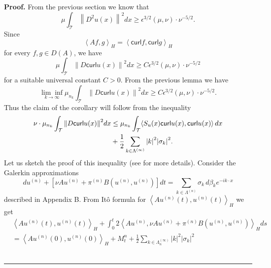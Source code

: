\documentclass[11pt]{preprint}
\newenvironment{proof}[1][Proof]{\textbf{#1.} }{\ \rule{0.5em}{0.5em}}
\begin{document}
\begin{proof}
From the previous section we know that
\[
\mu\int_{\mathcal{T}}\left\|  D^{2}u\left(  x\right)  \right\|  ^{2}%
dx\geq\epsilon^{3/2}\left(  \mu,\nu\right)  \cdot\nu^{-5/2}.
\]
Since
\begin{equation}
\left\langle Af,g\right\rangle _{H}=\left\langle \mathsf{curl}f,\mathsf{curl}%
g\right\rangle _{H}\label{A - curl}%
\end{equation}
for every $f,g\in D(A)$, we have
\[
\mu\int_{\mathcal{T}}\left\|  D\mathsf{curl}u\left(  x\right)  \right\|
^{2}dx\geq C\epsilon^{3/2}\left(  \mu,\nu\right)  \cdot\nu^{-5/2}%
\]
for a suitable universal constant $C>0$. From the previous lemma we have
\[
\underset{k\rightarrow\infty}{\lim\inf}\mu_{n_{k}}\int_{\mathcal{T}}\left\|
D\mathsf{curl}u\left(  x\right)  \right\|  ^{2}dx\geq C\epsilon^{3/2}\left(
\mu,\nu\right)  \cdot\nu^{-5/2}.
\]
Thus the claim of the corollary will follow from the inequality
\begin{align}
\nu\cdot\mu_{n_{k}}\int_{\mathcal{T}}\left\|  D\mathsf{curl}u\left(  x\right)
\right\|  ^{2}dx &  \leq\mu_{n_{k}}\int_{\mathcal{T}}\scal{S_{u}\left
( x\right) \mathsf{curl}u\left( x\right), \mathsf{curl}u\left( x\right
)}\,dx\label{curl balance for Galerkin}\\
&  +\frac{1}{2}\sum_{k\in\Lambda^{(\infty)}}\left|  k\right|  ^{2}\left|
\sigma_{k}\right|  ^{2}.\nonumber
\end{align}
Let us sketch the proof of this inequality (see \cite{FlaCetraro} for more
details). Consider the Galerkin approximations
\[
du^{\left(  n\right)  }+\left[  \nu Au^{\left(  n\right)  }+\pi^{\left(
n\right)  }B\left(  u^{\left(  n\right)  },u^{\left(  n\right)  }\right)
\right]  dt=\sum_{k\in\Lambda^{(n)}}\sigma_{k}\,d\beta_{k}e^{-ik\cdot x}%
\]
described in Appendix B. From It\^{o} formula for $\left\langle Au^{\left(
n\right)  }\left(  t\right)  ,u^{\left(  n\right)  }\left(  t\right)
\right\rangle _{H}$ we get
\begin{align*}
& \left\langle Au^{\left(  n\right)  }\left(  t\right)  ,u^{\left(  n\right)
}\left(  t\right)  \right\rangle _{H}+\int_{0}^{t}2\left\langle Au^{\left(
n\right)  },\nu Au^{\left(  n\right)  }+\pi^{\left(  n\right)  }B\left(
u^{\left(  n\right)  },u^{\left(  n\right)  }\right)  \right\rangle _{H}ds\\
& =\left\langle Au^{\left(  n\right)  }\left(  0\right)  ,u^{\left(  n\right)
}\left(  0\right)  \right\rangle _{H}+M_{t}^{n}+\frac{1}{2}\sum_{k\in
\Lambda_{n}^{(\infty)}}\left|  k\right|  ^{2}\left|  \sigma_{k}\right|  ^{2}%

\end{align*}
\end{proof}
\end{document}
